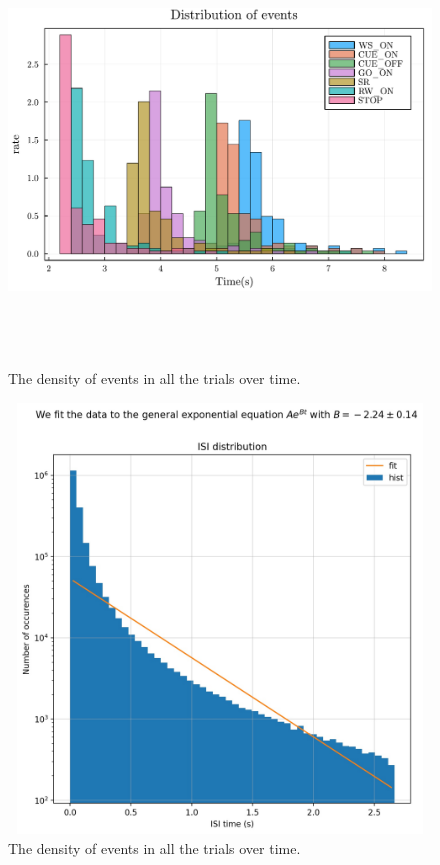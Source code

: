\documentclass[9pt,twocolumn]{paper-template}
\begin{document}
\begin{figure}
\centering
\includegraphics[width=12cm,height=11.4cm]{EvDist.pdf}
\caption{The density of events in all the trials over time.}\label{fig:side}
\end{figure}

\begin{figure}
\centering
\includegraphics[width=12cm,height=11.4cm]{isi_logfit.jpg}
\caption{The density of events in all the trials over time.}\label{fig:side}
\end{figure}
\end{document}
